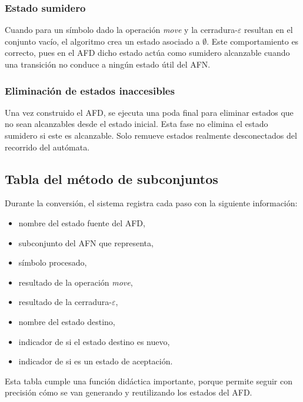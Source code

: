 \documentclass[12pt]{article}
\begin{document}
\subsubsection{Estado sumidero}

Cuando para un símbolo dado la operación \textit{move} y la cerradura-$\varepsilon$ resultan en el conjunto vacío, el algoritmo crea un estado asociado a $\emptyset$. Este comportamiento es correcto, pues en el AFD dicho estado actúa como sumidero alcanzable cuando una transición no conduce a ningún estado útil del AFN.

\subsubsection{Eliminación de estados inaccesibles}

Una vez construido el AFD, se ejecuta una poda final para eliminar estados que no sean alcanzables desde el estado inicial. Esta fase no elimina el estado sumidero si este es alcanzable. Solo remueve estados realmente desconectados del recorrido del autómata.

\subsection{Tabla del método de subconjuntos}

Durante la conversión, el sistema registra cada paso con la siguiente información:
\begin{itemize}
    \item nombre del estado fuente del AFD,
    \item subconjunto del AFN que representa,
    \item símbolo procesado,
    \item resultado de la operación \textit{move},
    \item resultado de la cerradura-$\varepsilon$,
    \item nombre del estado destino,
    \item indicador de si el estado destino es nuevo,
    \item indicador de si es un estado de aceptación.
\end{itemize}

Esta tabla cumple una función didáctica importante, porque permite seguir con precisión cómo se van generando y reutilizando los estados del AFD.

\end{document}
